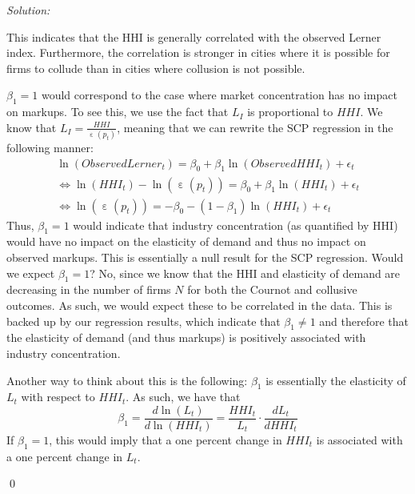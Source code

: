 \documentclass[12pt]{article}
\DeclareMathOperator{\eps}{\varepsilon}
\newenvironment{sol}
    {\emph{Solution:}
    }
    {
    \qed
    }
\begin{document}
\begin{sol}
      This indicates that the HHI is generally correlated with the observed Lerner index. Furthermore, the correlation is stronger in cities where it is possible for firms to collude than in cities where collusion is not possible. 

      $\beta_1 = 1$ would correspond to the case where market concentration has no impact on markups. To see this, we use the fact that $L_I$ is proportional to $HHI$. We know that $L_I = \frac{HHI}{\eps(p_t)}$, meaning that we can rewrite the SCP regression in the following manner:
      \begin{align*}
         \ln(ObservedLerner_t) = \beta_0 + \beta_1 \ln(ObservedHHI_t) + \epsilon_t\\
         \iff \ln(HHI_t) - \ln(\eps(p_t)) = \beta_0 + \beta_1 \ln(HHI_t) + \epsilon_t\\
         \iff \ln(\eps(p_t)) = -\beta_0 - (1-\beta_1 )\ln(HHI_t) + \epsilon_t
      \end{align*}
      Thus, $\beta_1 = 1$ would indicate that industry concentration (as quantified by HHI) would have no impact on the elasticity of demand and thus no impact on observed markups. This is essentially a null result for the SCP regression. Would we expect $\beta_1 = 1$? No, since we know that the HHI and elasticity of demand are decreasing in the number of firms $N$ for both the Cournot and collusive outcomes. As such, we would expect these to be correlated in the data. This is backed up by our regression results, which indicate that $\beta_1 \neq 1$ and therefore that the elasticity of demand (and thus markups) is positively associated with industry concentration. 

      Another way to think about this is the following: $\beta_1$ is essentially the elasticity of $L_t$ with respect to $HHI_t$. As such, we have that 
      \[\beta_1 = \frac{d \ln(L_t)}{d \ln(HHI_t)} = \frac{HHI_t}{L_t} \cdot \frac{d L_t}{d HHI_t}\]
      If $\beta_1 = 1$, this would imply that a one percent change in $HHI_t$ is associated with a one percent change in $L_t$. 
\end{sol}
\end{document}
